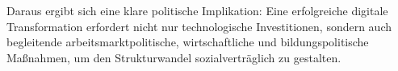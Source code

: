 Daraus ergibt sich eine klare politische Implikation: Eine erfolgreiche digitale 
Transformation erfordert nicht nur technologische Investitionen, sondern auch begleitende 
arbeitsmarktpolitische, wirtschaftliche und bildungspolitische Maßnahmen, um den 
Strukturwandel sozialverträglich zu gestalten.
